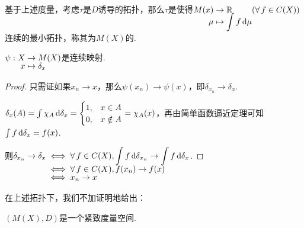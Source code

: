基于上述度量，考虑$\tau$是$D$诱导的拓扑，那么$\tau$是使得$\setjot[-4]\begin{aligned}[t]
    M(x)&\to \mb{R} \\
    \mu&\mapsto\int{f}\d\mu
\end{aligned}(\forall\,f\in C(X))$连续的最小拓扑，称其为$M(X)$的.\par
\begin{lemma}{}
    $\setjot[-2]\begin{aligned}[t]
        \psi:X&\to M(X) \\
        x&\mapsto\delta_x
    \end{aligned}$是连续映射.
\end{lemma}
\begin{proof}
    只需证如果$x_n\to x$，那么$\psi(x_n)\to\psi(x)$，即$\delta_{x_n}\to \delta_x$.\par
    $\delta_x(A)=\int\chi_A\mathop{}\!\mathrm{d}\delta_x=\begin{cases}
        1,&x\in A\\
        0,&x\notin A
    \end{cases}=\chi_A(x)$，再由简单函数逼近定理可知$\int{f}\mathop{}\!\mathrm{d}\delta_x=f(x)$.\par
    则$\setjot[-2]\begin{aligned}[t]
        \delta_{x_n}\to\delta_x &\iff \forall\, f\in C(X),\int{f}\d\delta_{x_n}\to\int{f}\d\delta_x \\
        &\iff \forall\, f\in C(X),f(x_n)\to f(x)\\
        &\iff x_n\to x
    \end{aligned}$.\par
\end{proof}

在上述拓扑下，我们不加证明地给出：
\begin{proposition}{}
    $(M(X),D)$是一个紧致度量空间.
\end{proposition}

